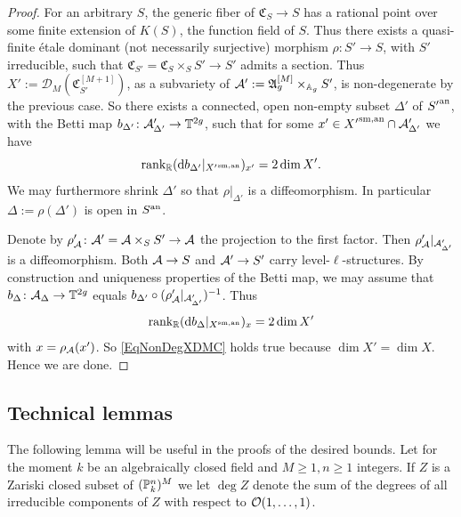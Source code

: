 \begin{proof}

For an arbitrary $S$, the generic fiber of $\mathfrak{C}_S \rightarrow
S$ has a rational point over some finite extension of $K(S)$, the
function field of $S$. Thus there exists a quasi-finite \'{e}tale
dominant (not necessarily surjective) morphism $\rho \colon S'
\rightarrow S$, with $S'$ irreducible, such that $\mathfrak{C}_{S'} = \mathfrak{C}_S \times_S
S' \rightarrow S'$ admits a section. Thus $X' :=
\mathscr{D}_M(\mathfrak{C}_{S'}^{[M+1]})$, as a subvariety of
$\mathcal{A}':=\mathfrak{A}_g^{[M]}\times_{\mathbb{A}_g} S'$,  is
non-degenerate by the previous case. So there exists a connected, open non-empty subset $\Delta'$ of ${S'}^{\mathrm{an}}$, with the Betti map $b_{\Delta'} \colon \mathcal{A}'_{\Delta'} \rightarrow \mathbb{T}^{2g}$, such that for some $x' \in {X'}^{\mathrm{sm,an}} \cap \mathcal{A}'_{\Delta'}$ we have
\[
\mathrm{rank}_{{\mathbb{R}}} (\mathrm{d}b_{\Delta'}|_{{X'}^{\mathrm{sm,an}}})_{x'} = 2\dim X'.
\]
We may furthermore shrink $\Delta'$ so that $\rho|_{\Delta'}$ is a diffeomorphism. In particular $\Delta:=\rho(\Delta')$ is open in ${S}^{\mathrm{an}}$.

Denote by $\rho'_{\mathcal{A}} \colon \mathcal{A}' = \mathcal{A}\times_S S' \rightarrow \mathcal{A}$
the projection to the first factor. Then
$\rho'_{\mathcal{A}}|_{\mathcal{A}'_{\Delta'}}$ is a diffeomorphism. Both $\mathcal{A}
\rightarrow S$ and $\mathcal{A}' \rightarrow S'$ carry
level-$\ell$-structures. By construction and uniqueness properties of
the Betti map, we may assume that $b_{\Delta} \colon \mathcal{A}_{\Delta} \rightarrow \mathbb{T}^{2g}$ equals $b_{\Delta'} \circ  (\rho'_{\mathcal{A}}|_{\mathcal{A}'_{\Delta'}})^{-1}$. Thus
\[
\mathrm{rank}_{{\mathbb{R}}} (\mathrm{d}b_{\Delta}|_{{X}^{\mathrm{sm,an}}})_{x} = 2\dim X'
\]
with $x = \rho_{\mathcal{A}}(x')$. So \eqref{EqNonDegXDMC} holds true because $\dim X' = \dim X$. Hence we are done.
\end{proof}



\subsection{Technical lemmas}


The following lemma will be useful in the proofs of the desired
bounds. Let for the moment $k$ be an algebraically closed field and
$M\ge 1,n\ge 1$ integers. If $Z$ is a Zariski closed subset of $({\mathbb{P}}_k^n)^M$
we let $\deg Z$ denote the sum of the degrees of all irreducible
components of $Z$ with respect to ${\mathcal O}(1,\ldots,1)$. 

